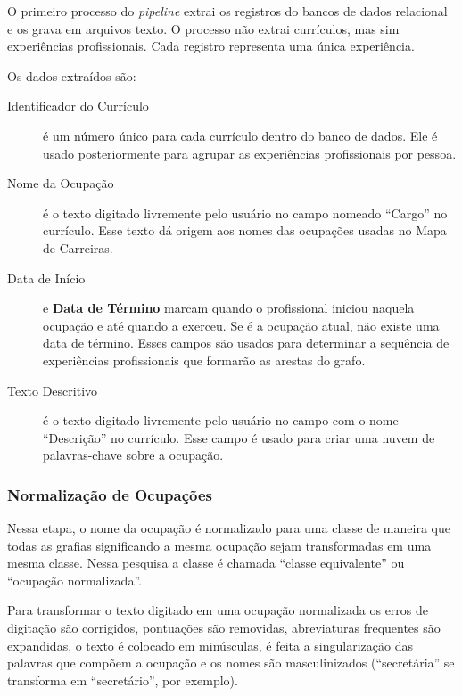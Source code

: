 \documentclass[12pt,a4paper]{article}
\theoremstyle{hypo}
\begin{document}
O primeiro processo do \textit{pipeline} extrai os registros do bancos de dados relacional e os grava em arquivos texto. O processo não extrai currículos, mas sim experiências profissionais. Cada registro representa uma única experiência.

Os dados extraídos são:

\begin{description}

  \item[Identificador do Currículo] é um número único para cada currículo dentro do banco de dados. Ele é usado posteriormente para agrupar as experiências profissionais por pessoa.

  \item[Nome da Ocupação] é o texto digitado livremente pelo usuário no campo nomeado \enquote{Cargo} no currículo. Esse texto dá origem aos nomes das ocupações usadas no Mapa de Carreiras.

  \item[Data de Início] e \textbf{Data de Término} marcam quando o profissional iniciou naquela ocupação e até quando a exerceu. Se é a ocupação atual, não existe uma data de término. Esses campos são usados para determinar a sequência de experiências profissionais que formarão as arestas do grafo.

  \item[Texto Descritivo] é o texto digitado livremente pelo usuário no campo com o nome \enquote{Descrição} no currículo. Esse campo é usado para criar uma nuvem de palavras-chave sobre a ocupação.

\end{description}

\subsubsection{Normalização de Ocupações} \label{sec:normalizacao}

Nessa etapa, o nome da ocupação é normalizado para uma classe de maneira que todas as grafias significando a mesma ocupação sejam transformadas em uma mesma classe. Nessa pesquisa a classe é chamada \enquote{classe equivalente} ou \enquote{ocupação normalizada}.

Para transformar o texto digitado em uma ocupação normalizada os erros de digitação são corrigidos, pontuações são removidas, abreviaturas frequentes são expandidas, o texto é colocado em minúsculas, é feita a singularização das palavras que compõem a ocupação e os nomes são masculinizados (\enquote{secretária} se transforma em \enquote{secretário}, por exemplo).
\end{document}

